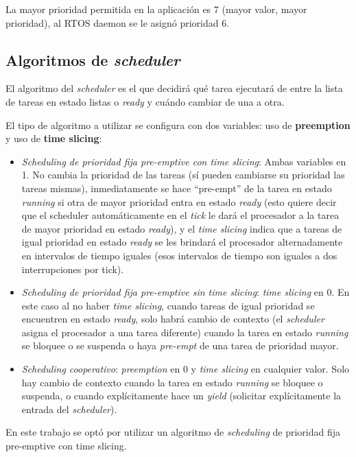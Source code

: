 \documentclass{IEEEtran}
\begin{document}
La mayor prioridad permitida en la aplicación es 7 (mayor valor, mayor prioridad), al RTOS daemon se le asignó prioridad 6.

\subsection{Algoritmos de \textit{scheduler}}
El algoritmo del \textit{scheduler} es el que decidirá qué tarea ejecutará de entre la lista de tareas en estado listas o \textit{ready} y cuándo cambiar de una a otra.

El tipo de algoritmo a utilizar se configura con dos variables: uso de \textbf{preemption} y uso de \textbf{time slicing}:

\begin{itemize}
    \item \textit{Scheduling de prioridad fija pre-emptive con time slicing}: Ambas variables en 1. No cambia la prioridad de las tareas (sí pueden cambiarse su prioridad las tareas mismas), inmediatamente se hace ``pre-empt'' de la tarea en estado \textit{running} si otra de mayor prioridad entra en estado \textit{ready} (esto quiere decir que el scheduler automáticamente en el \textit{tick} le dará el procesador a la tarea de mayor prioridad en estado \textit{ready}), y el \textit{time slicing} indica que a tareas de igual prioridad en estado \textit{ready} se les brindará el procesador alternadamente en intervalos de tiempo iguales (esos intervalos de tiempo son iguales a dos interrupciones por tick).
    \item \textit{Scheduling de prioridad fija pre-emptive sin time slicing}: \textit{time slicing} en 0. En este caso al no haber \textit{time slicing}, cuando tareas de igual prioridad se encuentren en estado \textit{ready}, solo habrá cambio de contexto (el \textit{scheduler} asigna el procesador a una tarea diferente) cuando la tarea en estado \textit{running} se bloquee o se suspenda o haya \textit{pre-empt} de una tarea de prioridad mayor.
    \item \textit{Scheduling cooperativo}: \textit{preemption} en 0 y \textit{time slicing} en cualquier valor. Solo hay cambio de contexto cuando la tarea en estado \textit{running} se bloquee o suspenda, o cuando explícitamente hace un \textit{yield} (solicitar explícitamente la entrada del \textit{scheduler}).
\end{itemize}

En este trabajo se optó por utilizar un algoritmo de \textit{scheduling} de prioridad fija pre-emptive con time slicing.
\end{document}
